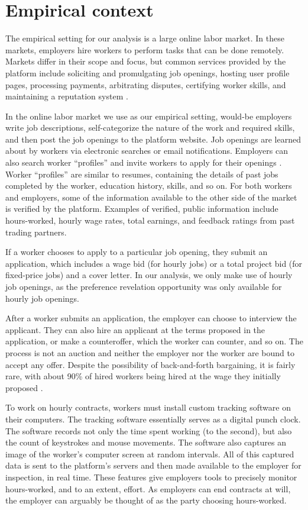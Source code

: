 \documentclass[12pt]{article}
\begin{document}
\section{Empirical context} \label{sec:empirical_context}

The empirical setting for our analysis is a large online labor market.
In these markets, employers hire workers to perform tasks that can be done remotely.
Markets differ in their scope and focus, but common services provided by the platform include soliciting and promulgating job openings, hosting user profile pages, processing payments, arbitrating disputes, certifying worker skills, and maintaining a reputation system \citep{Horton2010, horton2015reputation}.

In the online labor market we use as our empirical setting, would-be employers write job descriptions, self-categorize the nature of the work and required skills, and then post the job openings to the platform website.
Job openings are learned about by workers via electronic searches or email notifications.
Employers can also search worker ``profiles'' and invite workers to apply for their openings \citep{horton2017effects}.
Worker ``profiles''  are similar to resumes, containing the details of past jobs completed by the worker, education history, skills, and so on.
For both workers and employers, some of the information available to the other side of the market is verified by the platform.
Examples of verified, public information include hours-worked, hourly wage rates, total earnings, and feedback ratings from past trading partners.

If a worker chooses to apply to a particular job opening, they submit an application, which includes a wage bid (for hourly jobs) or a total project bid (for fixed-price jobs) and a cover letter.
In our analysis, we only make use of hourly job openings, as the preference revelation opportunity was only available for hourly job openings. 

After a worker submits an application, the employer can choose to interview the applicant.
They can also hire an applicant at the terms proposed in the application, or make a counteroffer, which the worker can counter, and so on.
The process is not an auction and neither the employer nor the worker are bound to accept any offer. 
Despite the possibility of back-and-forth bargaining, it is fairly rare, with about 90\% of hired workers being hired at the wage they initially proposed \citep{barach2016info}.

To work on hourly contracts, workers must install custom tracking software on their computers. 
The tracking software essentially serves as a digital punch clock.
The software records not only the time spent working (to the second), but also the count of keystrokes and mouse movements.
The software also captures an image of the worker's computer screen at random intervals.
All of this captured data is sent to the platform's servers and then made available to the employer for inspection, in real time.
These features give employers tools to precisely monitor hours-worked, and to an extent, effort.
As employers can end contracts at will, the employer can arguably be thought of as the party choosing hours-worked.
\end{document}

